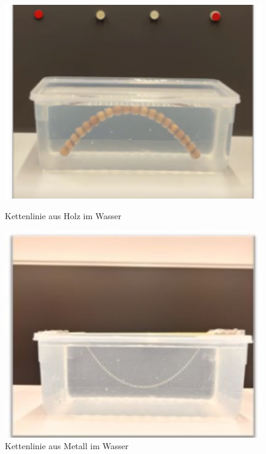 \begin{figure}
	\centering
	\begin{minipage}{0.5\textwidth}
		\centering
		\includegraphics[width=1\textwidth]{papers/kettenlinie/images/kettenlinie_holz_wasser.png}
		\caption{Kettenlinie aus Holz im Wasser}
		\label{fig:Kettenlinie-Holz-Wasser}
	\end{minipage}\hfill
	\begin{minipage}{0.5\textwidth}
		\centering
		\includegraphics[width=1\textwidth]{papers/kettenlinie/images/kettenlinie_metall_wasser.jpg}
		\caption{Kettenlinie aus Metall im Wasser}
		\label{fig:Kettenlinie-Metall-Wasser}
	\end{minipage}
\end{figure}
